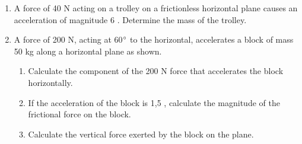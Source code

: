 {\begin{enumerate}
{      \begin{enumerate}
      \item{What is its acceleration?}
      \item{How fast will it be travelling after 20~s?}
      \item{How long will it take to reach a speed of 35~\ms?}
      \item{How far will it travel from its starting point in 15~s?}
      \end{enumerate}}
  \item{A force of 40 N acting on a trolley on a frictionless horizontal plane causes an acceleration of magnitude 6 \mss. Determine the mass of the trolley.}
  \item {A force of 200 N, acting at 60$^{\circ}$ to the horizontal, accelerates a block of mass 50 kg along a horizontal plane as shown.
      \begin{figure}[H]
        \begin{center}
        \end{center}
      \end{figure}
      \begin{enumerate}
      \item Calculate the component of the 200 N force that accelerates the block horizontally.
      \item If the acceleration of the block is 1,5 \mss, calculate the magnitude of the frictional force on the block.
      \item Calculate the vertical force exerted by the block on the plane.

\end{enumerate}}
\end{enumerate}}
